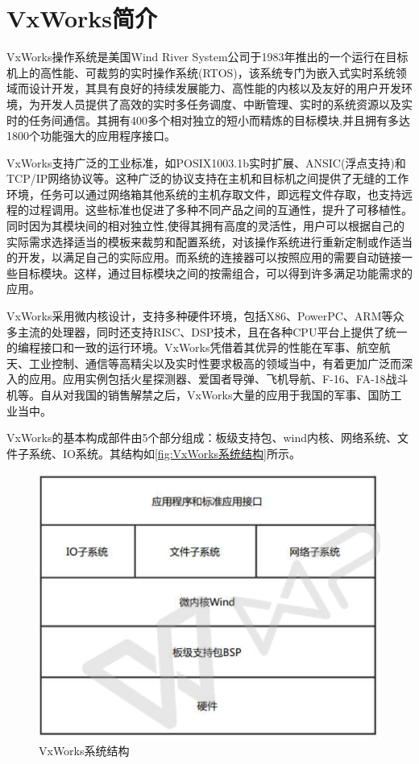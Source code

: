 \section{VxWorks简介}
	VxWorks操作系统是美国Wind River System公司于1983年推出的一个运行在目标机上的高性能、可裁剪的实时操作系统(RTOS)，该系统专门为嵌入式实时系统领域而设计开发，其具有良好的持续发展能力、高性能的内核以及友好的用户开发环境，为开发人员提供了高效的实时多任务调度、中断管理、实时的系统资源以及实时的任务间通信。其拥有400多个相对独立的短小而精炼的目标模块,并且拥有多达1800个功能强大的应用程序接口\cite{嵌入式实时操作系统VxWorks及其开发环境Tornado}。
	
	VxWorks支持广泛的工业标准，如POSIX1003.1b实时扩展、ANSIC(浮点支持)和TCP/IP网络协议等。这种广泛的协议支持在主机和目标机之间提供了无缝的工作环境，任务可以通过网络箱其他系统的主机存取文件，即远程文件存取，也支持远程的过程调用。这些标准也促进了多种不同产品之间的互通性，提升了可移植性。同时因为其模块间的相对独立性,使得其拥有高度的灵活性，用户可以根据自己的实际需求选择适当的模板来裁剪和配置系统，对该操作系统进行重新定制或作适当的开发，以满足自己的实际应用。而系统的连接器可以按照应用的需要自动链接一些目标模块。这样，通过目标模块之间的按需组合，可以得到许多满足功能需求的应用。
	
	VxWorks采用微内核设计，支持多种硬件环境，包括X86、PowerPC、ARM等众多主流的处理器，同时还支持RISC、DSP技术，且在各种CPU平台上提供了统一的编程接口和一致的运行环境。VxWorks凭借着其优异的性能在军事、航空航天、工业控制、通信等高精尖以及实时性要求极高的领域当中，有着更加广泛而深入的应用。应用实例包括火星探测器、爱国者导弹、飞机导航、F-16、FA-18战斗机等\cite{嵌入式实时操作系统VxWorks及其开发环境Tornado}。自从对我国的销售解禁之后，VxWorks大量的应用于我国的军事、国防工业当中。
	
	VxWorks的基本构成部件由5个部分组成：板级支持包、wind内核、网络系统、文件子系统、IO系统。其结构如\autoref{fig:VxWorks系统结构}所示。
\begin{figure}[!h]
\centering
\includegraphics[width=.7\textwidth]{./graphics/VxWorks-sys-structure.pdf}
\caption{VxWorks系统结构}\label{fig:VxWorks系统结构}
\end{figure}

